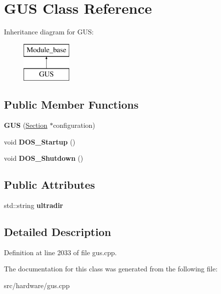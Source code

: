 \hypertarget{classGUS}{\section{G\-U\-S Class Reference}
\label{classGUS}
}
Inheritance diagram for G\-U\-S\-:\begin{figure}[H]
\begin{center}
\leavevmode
\includegraphics[height=2.000000cm]{classGUS}
\end{center}
\end{figure}
\subsection*{Public Member Functions}
\begin{DoxyCompactItemize}
\item 
\hypertarget{classGUS_a4ee14e2fc1aae1aef9cc6306d227dbf2}{{\bfseries G\-U\-S} (\hyperlink{classSection}{Section} $\ast$configuration)}\label{classGUS_a4ee14e2fc1aae1aef9cc6306d227dbf2}

\item 
\hypertarget{classGUS_aeb099ead25e3d56aeb70ecf72a85f14f}{void {\bfseries D\-O\-S\-\_\-\-Startup} ()}\label{classGUS_aeb099ead25e3d56aeb70ecf72a85f14f}

\item 
\hypertarget{classGUS_a36434682ec12dc37bd71575231bf287d}{void {\bfseries D\-O\-S\-\_\-\-Shutdown} ()}\label{classGUS_a36434682ec12dc37bd71575231bf287d}

\end{DoxyCompactItemize}
\subsection*{Public Attributes}
\begin{DoxyCompactItemize}
\item 
\hypertarget{classGUS_a3f1bfc9fabf97294cd24f1631368729a}{std\-::string {\bfseries ultradir}}\label{classGUS_a3f1bfc9fabf97294cd24f1631368729a}

\end{DoxyCompactItemize}


\subsection{Detailed Description}


Definition at line 2033 of file gus.\-cpp.



The documentation for this class was generated from the following file\-:\begin{DoxyCompactItemize}
\item 
src/hardware/gus.\-cpp\end{DoxyCompactItemize}
